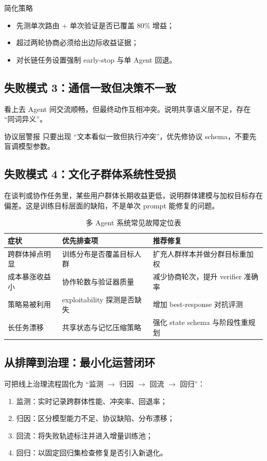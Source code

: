 \documentclass[a4paper]{article}
\begin{document}
\begin{knowledgebox}{简化策略}
\begin{itemize}
    \item 先测单次路由 + 单次验证是否已覆盖 80\% 增益；
    \item 超过两轮协商必须给出边际收益证据；
    \item 对长链任务设置强制 early-stop 与单 Agent 回退。
\end{itemize}
\end{knowledgebox}

\subsection{失败模式 3：通信一致但决策不一致}
看上去 Agent 间交流顺畅，但最终动作互相冲突。说明共享语义层不足，存在 ``同词异义''。

\begin{warningbox}{协议层警报}
只要出现 ``文本看似一致但执行冲突''，优先修协议 schema，不要先盲调模型参数。
\end{warningbox}

\subsection{失败模式 4：文化子群体系统性受损}
在谈判或协作任务里，某些用户群体长期收益更低，说明群体建模与加权目标存在偏差。这是训练目标层面的缺陷，不是单次 prompt 能修复的问题。

\begin{table}[H]
\centering
\begin{tabular}{p{3.0cm}p{4.2cm}p{4.2cm}}
\toprule
\textbf{症状} & \textbf{优先排查项} & \textbf{推荐修复} \\
\midrule
跨群体掉点明显 & 训练分布是否覆盖目标人群 & 扩充人群样本并做分群目标重加权 \\
成本暴涨收益小 & 协作轮数与验证器质量 & 减少协商轮次，提升 verifier 准确率 \\
策略易被利用 & exploitability 探测是否缺失 & 增加 best-response 对抗评测 \\
长任务漂移 & 共享状态与记忆压缩策略 & 强化 state schema 与阶段性重规划 \\
\bottomrule
\end{tabular}
\caption{多 Agent 系统常见故障定位表}
\end{table}

\subsection{从排障到治理：最小化运营闭环}
可把线上治理流程固化为 ``监测 $\rightarrow$ 归因 $\rightarrow$ 回流 $\rightarrow$ 回归''：
\begin{enumerate}
    \item 监测：实时记录跨群体性能、冲突率、回退率；
    \item 归因：区分模型能力不足、协议缺陷、分布漂移；
    \item 回流：将失败轨迹标注并进入增量训练池；
    \item 回归：以固定回归集检查修复是否引入新退化。
\end{enumerate}
\end{document}
